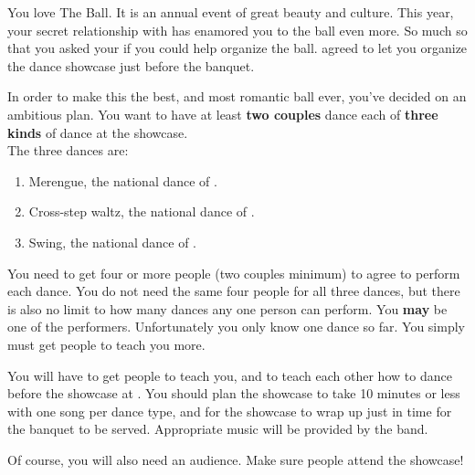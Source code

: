 \documentclass[green]{NeptuneBall}
\begin{document}
\name{\gDance{}}

You love The \cExExKing{} Ball. It is an annual event of great beauty and culture. This year, your secret relationship with \cDiplomat{} has enamored you to the ball even more. So much so that you asked your \cKing{\parent} if you could help organize the ball. \cKing{} agreed to let you organize the dance showcase just before the banquet.

In order to make this the best, and most romantic ball ever, you've decided on an ambitious plan.  You want to have at least {\bf two couples} dance each of {\bf three  kinds} of dance at the showcase.\\

The three dances are:
\begin{enumerate}
\item Merengue, the national dance of \pAtlantis{}.
\item Cross-step waltz, the national dance of \pPacifica{}.
\item Swing, the national dance of \pAmerica{}.
\end{enumerate}

You need to get four or more people (two couples minimum) to agree to perform each dance. You do not need the same four people for all three dances, but there is also no limit to how many dances any one person can perform. You {\bf may} be one of the performers. Unfortunately you only know one dance so far. You simply must get people to teach you more.

You will have to get people to teach you, and to teach each other how to dance before the showcase at {\bf \cTOneFifty{}}. You should plan the showcase to take 10 minutes or less with one song per dance type, and for the showcase to wrap up just in time for the banquet to be served. Appropriate music will be provided by the band.

Of course, you will also need an audience. Make sure people attend the showcase!
\end{document}
